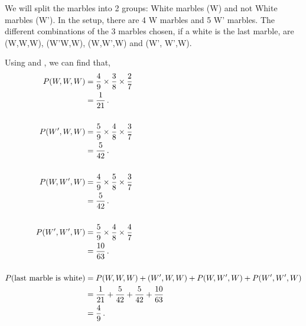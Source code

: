 \begin{subquestions}
\begin{subsubquestions}

\subsubquestion

We will split the marbles into 2 groups: White marbles (W) and not White marbles (W'). In the setup, there are 4 W marbles and 5 W' marbles. The different combinations of the 3 marbles chosen, if a white is the last marble, are (W,W,W), (W'W,W), (W,W',W) and (W', W',W). 

Using  and , we can find that,
\begin{align}
	P(W,W,W) & = \frac{4}{9} \times \frac{3}{8} \times \frac{2}{7} \nonumber \\
	         & = \frac{1}{21} \,. \\ \nonumber \\
	P(W',W,W) & = \frac{5}{9} \times \frac{4}{8} \times \frac{3}{7} \nonumber \\
              & = \frac{5}{42} \,. \\ \nonumber \\
	P(W,W',W) & = \frac{4}{9} \times \frac{5}{8} \times \frac{3}{7} \nonumber \\
			  & = \frac{5}{42} \,. \\ \nonumber \\
	P(W',W',W)& = \frac{5}{9} \times \frac{4}{8} \times \frac{4}{7} \nonumber \\
			  & = \frac{10}{63} \,. \\ \nonumber \\
	P(\text{last marble is white}) & = P(W,W,W)+(W',W,W)+P(W,W',W)+P(W',W',W) \nonumber \\
	& = \frac{1}{21} + \frac{5}{42} + \frac{5}{42} + \frac{10}{63} \nonumber \\
	                               & = \frac{4}{9} \,.
\end{align}

\end{subsubquestions}

\end{subquestions}